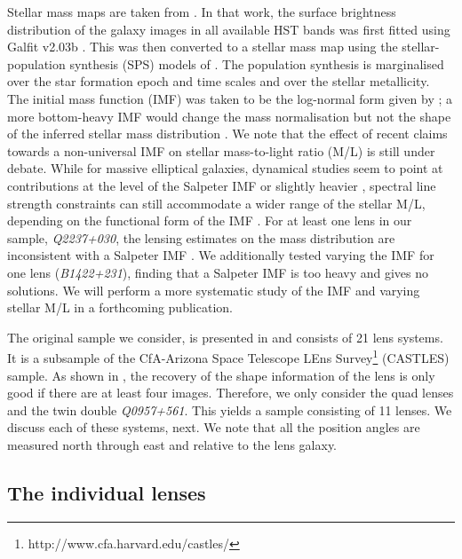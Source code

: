 \documentclass[useAMS,usenatbib]{mn2e}
\begin{document}
Stellar mass maps are taken from \citet{2011ApJ...740...97L}. In that work, the surface brightness distribution of the galaxy images in all available HST bands was first fitted using {\sc Galfit v2.03b} \citep{2002AJ....124..266P}. This was then converted to a stellar mass map using the stellar-population synthesis (SPS) models of \citet{2003MNRAS.344.1000B}. The population synthesis is marginalised over the star formation epoch and time scales and over the stellar metallicity. The initial mass function (IMF) was taken to be the log-normal form given by \citet{2003PASP..115..763C}; a more bottom-heavy IMF would change the mass normalisation \citep[cf.][]{2014ApJ...793...96S} but not the shape of the inferred stellar mass distribution \citep[unless the IMF presents significant intrinsic deviations locally, see e.g.][]{2015MNRAS.447.1033M}. We note that the effect of recent claims towards a non-universal IMF on stellar mass-to-light ratio (M/L) is still under debate. While for massive elliptical galaxies, dynamical studies seem to point at contributions at the level of the Salpeter IMF or slightly heavier \citep{2013MNRAS.432.1862C}, spectral line strength constraints can still accommodate a wider range of the stellar M/L, depending on the functional form of the IMF \citep{2013MNRAS.429L..15F}. For at least one lens in our sample, \textit{Q2237+030}, the lensing estimates on the mass distribution are inconsistent with a Salpeter IMF \citep{2010MNRAS.409L..30F}. We additionally tested varying the IMF for one lens ({\it B1422+231}), finding that a Salpeter IMF is too heavy and gives no solutions. We will perform a more systematic study of the IMF and varying stellar M/L in a forthcoming publication.

The original sample we consider, is presented in \citet{2011ApJ...740...97L} and consists of 21 lens systems. It is a subsample of the CfA-Arizona Space Telescope LEns Survey\footnote{http://www.cfa.harvard.edu/castles/} (CASTLES) sample. As shown in \citet{2014MNRAS.445.2181C}, the recovery of the shape information of the lens is only good if there are at least four images. Therefore, we only consider the quad lenses and the twin double \textit{Q0957+561}. This yields a sample consisting of 11 lenses. We discuss each of these systems, next. We note that all the position angles are measured north through east and relative to the lens galaxy.


\subsection{The individual lenses}
\end{document}

